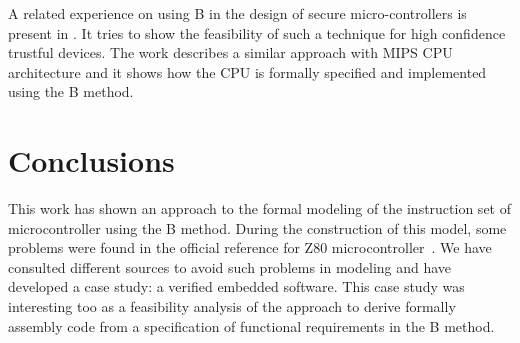 \documentclass[a4paper]{llncs}
\begin{document}
A related experience on using B in the design of secure
micro-controllers is present in \cite{Marc20113}. It tries to show the
feasibility of such a technique for high confidence trustful
devices. The work \cite{Subotic2010} describes a similar approach with
MIPS CPU architecture and it shows how the CPU is formally specified
and implemented using the B method.

% 
%
%
%


 
\section{Conclusions}
\label{sec:conclusions} 

This work has shown an approach to the formal modeling of the
instruction set of microcontroller using the B method.  During the
construction of this model, some problems were found in the official
reference for Z80 microcontroller~\cite{Z80_manual}. We have consulted
different sources \cite{Simulator_z80,Z80_manual} to
avoid such problems in modeling and have developed a case study: a
verified embedded software.  This case study was interesting too as a
feasibility analysis of the approach to derive formally assembly code
from a specification of functional requirements in the B method.

\end{document}
